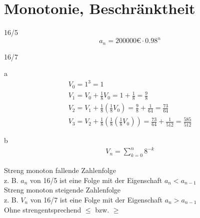 \section{Monotonie, Beschränktheit}
\begin{exercise}{16/5}
  $$a_n = 200000€ \cdot 0.98^n$$
\end{exercise}
\begin{exercise}{16/7}
  \item [a]
  \begin{gather*}
    V_0 = 1^3 = 1 \\
    V_1 = V_0 + \frac{1}{8} V_0 = 1 + \frac{1}{8} = \frac{9}{8} \\
    V_2 = V_1 + \frac{1}{8}(\frac{1}{8} V_0) = \frac{9}{8} + \frac{1}{64} = \frac{73}{64} \\
    V_3 = V_2 + \frac{1}{8}(\frac{1}{8}(\frac{1}{8} V_0)) = \frac{73}{64} + \frac{1}{512} = \frac{585}{512}
  \end{gather*}
  \item [b]
  \begin{gather*}
    V_n = \sum^n_{k = 0} 8^{-k}
  \end{gather*}
\end{exercise}
Streng monoton fallende Zahlenfolge \\
\;z. B. $a_n$ von 16/5 ist eine Folge mit der Eigenschaft $a_n < a_{n - 1}$ \\
Streng monoton steigende Zahlenfolge \\
\;z. B. $V_n$ von 16/7 ist eine Folge mit der Eigenschaft $a_n > a_{n - 1}$ \\
Ohne \glqq streng\grqq entsprechend $\leq$ bzw. $\geq$
